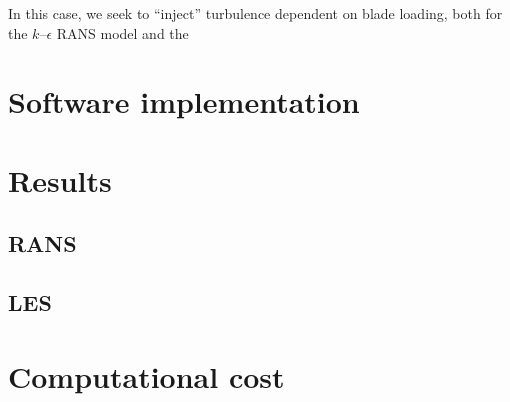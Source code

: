 In this case, we seek to ``inject'' turbulence dependent on blade loading, both
for the $k$--$\epsilon$ RANS model and the

\section{Software implementation}

\section{Results}

\subsection{RANS}

\subsection{LES}

\section{Computational cost}
